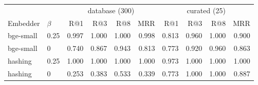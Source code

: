 \begin{tabular}{llrrrrrrrr}
\toprule
 & & \multicolumn{4}{c}{database (300)} & \multicolumn{4}{c}{curated (25)} \\
Embedder & $\beta$ & R@1 & R@3 & R@8 & MRR & R@1 & R@3 & R@8 & MRR \\
\midrule
bge-small & 0.25 & 0.997 & 1.000 & 1.000 & 0.998 & 0.813 & 0.960 & 1.000 & 0.900 \\
bge-small & 0 & 0.740 & 0.867 & 0.943 & 0.813 & 0.773 & 0.920 & 0.960 & 0.863 \\
hashing & 0.25 & 1.000 & 1.000 & 1.000 & 1.000 & 0.973 & 1.000 & 1.000 & 1.000 \\
hashing & 0 & 0.253 & 0.383 & 0.533 & 0.339 & 0.773 & 1.000 & 1.000 & 0.887 \\
\bottomrule
\end{tabular}
